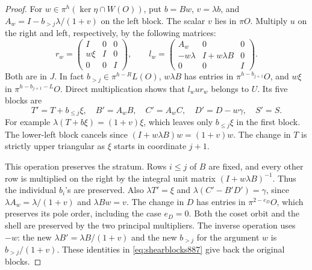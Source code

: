 \documentclass[a4paper,11pt]{article}
\theoremstyle{definition}
\theoremstyle{remark}
\numberwithin{equation}{section}
\begin{document}
\begin{proof}
For \(w\in\pi^h(\ker\eta\cap W(O))\), put \(b=B w\),
\(v=\lambda b\), and
\(A_w=I-b_{>j}\lambda/(1+v)\) on the left block. The scalar
\(v\) lies in \(\pi O\). Multiply \(u\) on the right and left,
respectively, by the following matrices:
\[
 r_w=\begin{pmatrix}I&0&0\\ w\xi&I&0\\0&0&I\end{pmatrix},
 \qquad
 l_w=\begin{pmatrix}
       A_w&0&0\\ -w\lambda&I+w\lambda B&0\\0&0&I
      \end{pmatrix}.
\]
Both are in \(J\). In fact \(b_{>j}\in\pi^{h-R}L(O)\),
\(w\lambda B\) has entries in \(\pi^{h-b_{j+1}}O\), and
\(w\xi\) in \(\pi^{h-b_{j+1}-L}O\). Direct multiplication shows
that \(l_w u r_w\) belongs to \(U\). Its five blocks are
\begin{equation}
 T'=T+b_{\le j}\xi,\quad B'=A_w B,\quad C'=A_w C,\quad
 D'=D-w\gamma,\quad S'=S .
 \label{eq:shearblocks887}
\end{equation}
For example \(\lambda(T+b\xi)=(1+v)\xi\), which leaves only
\(b_{\le j}\xi\) in the first block. The lower-left block cancels
since \((I+w\lambda B)w=(1+v)w\). The change in \(T\) is
strictly upper triangular as \(\xi\) starts in coordinate \(j+1\).

This operation preserves the stratum. Rows \(i\le j\) of \(B\)
are fixed, and every other row is multiplied on the right by
the integral unit matrix \((I+w\lambda B)^{-1}\).
Thus the individual \(b_i\)'s are preserved. Also
\(\lambda T'=\xi\) and \(\lambda(C'-B'D')=\gamma\), since
\(\lambda A_w=\lambda/(1+v)\) and \(\lambda B w=v\).
The change in \(D\) has entries in \(\pi^{2-e_D}O\), which
preserves its pole order, including the case \(e_D=0\).
Both the coset orbit and the shell are preserved by the two
principal multipliers. The inverse operation uses \(-w\):
the new \(\lambda B'=\lambda B/(1+v)\) and the new
\(b_{>j}\) for the argument \(w\) is \(b_{>j}/(1+v)\).
These identities in \eqref{eq:shearblocks887} give back the
original blocks.


\end{proof}
\end{document}
